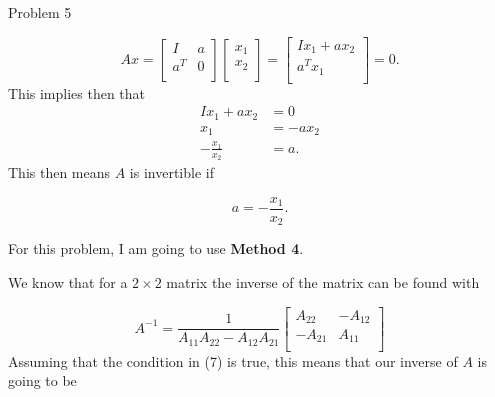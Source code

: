 \begin{problem}{Problem 5}
\begin{Highlight}
        \begin{equation}
            Ax = 
            \begin{bmatrix}
                I & a \\
                a^{T} & 0 \\
            \end{bmatrix}
            \begin{bmatrix}
                x_{1} \\
                x_{2} \\
            \end{bmatrix}
            = 
            \begin{bmatrix}
                Ix_{1} + ax_{2} \\
                a^{T}x_{1} \\
            \end{bmatrix}
            = 0.
        \end{equation}
        This implies then that
        \begin{align}
            Ix_{1} + ax_{2} & = 0 \\
            x_{1} & = -ax_{2} \\
            -\frac{x_{1}}{x_{2}} & = a.
        \end{align}
        This then means $A$ is invertible if 
        
        \begin{equation}
            a = -\frac{x_{1}}{x_{2}}.
        \end{equation}
    \end{Highlight}

    \begin{Highlight}
        \noindent For this problem, I am going to use \textbf{Method 4}. \vspace*{1em}

        We know that for a $2 \times 2$ matrix the inverse of the matrix can be found with 

        \begin{equation}
            A^{-1} = \frac{1}{A_{11}A_{22} - A_{12}A_{21}}
            \begin{bmatrix}
                A_{22} & -A_{12} \\
                -A_{21} & A_{11} \\
            \end{bmatrix}
        \end{equation}
        Assuming that the condition in (7) is true, this means that our inverse of $A$ is going to be


\end{Highlight}
\end{problem}
